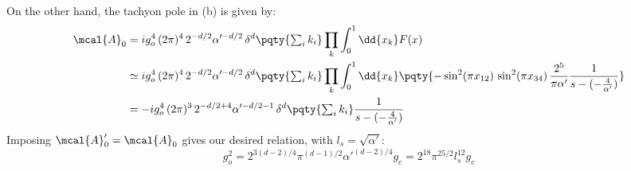 \documentclass[a4paper,10pt]{article}
\begin{document}
\begin{enumerate}
\begin{enumerate}
	On the other hand, the tachyon pole in (b) is given by:
	\begin{equation}
	\begin{aligned}
		\mcal{A}_0
		&= ig_o^4\, (2\pi)^4\,
			2^{-d/2} \alpha'^{-d/2}\,
			\delta^d\pqty{\textstyle\sum_i k_i}
			\prod_k \int_0^1 \dd{x_k} F(x) \\
		&\simeq ig_o^4\, (2\pi)^4\,
			2^{-d/2} \alpha'^{-d/2}\,
			\delta^d\pqty{\textstyle\sum_i k_i}
			\prod_k \int_0^1 \dd{x_k}
			\pqty{
				-\sin^2 (\pi x_{12})\,
				\sin^2 (\pi x_{34})\,
				\frac{2^5}{\pi\alpha'}
				\frac{1}{s - (-\frac{4}{\alpha'})}
			} \\
		&= -ig_o^4\, (2\pi)^3\,
			2^{-d/2+4} \alpha'^{-d/2-1}\,
			\delta^d\pqty{\textstyle\sum_i k_i}
			\frac{1}{s - (-\frac{4}{\alpha'})}
	\end{aligned}
	\end{equation}
	Imposing $\mcal{A}'_0 = \mcal{A}_0$ gives our desired relation, with $l_s = \sqrt{\alpha'}$:
	\begin{equation}
		g_o^2
		= 2^{3(d-2)/4} \pi^{(d-1)/2} \alpha'^{(d-2)/4} g_c
		= 2^{18} \pi^{25/2} l_s^{12} g_c
	\end{equation}
	
	\end{enumerate}
	
	\end{enumerate}

\printbibliography[%
	,heading = bibintoc
]
\end{document}
